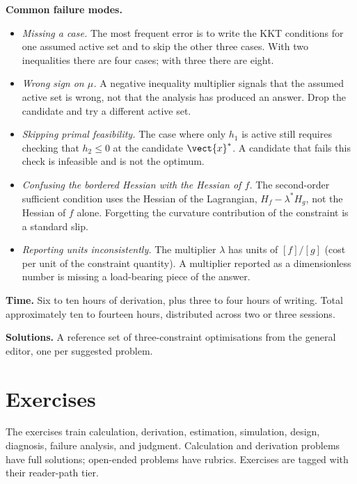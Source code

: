 \begin{project}
\textbf{Common failure modes.}
\begin{itemize}[leftmargin=*]
  \item \textit{Missing a case.} The most frequent error is to
    write the KKT conditions for one assumed active set and to
    skip the other three cases. With two inequalities there are
    four cases; with three there are eight.
  \item \textit{Wrong sign on $\mu$.} A negative inequality
    multiplier signals that the assumed active set is wrong, not
    that the analysis has produced an answer. Drop the candidate
    and try a different active set.
  \item \textit{Skipping primal feasibility.} The case where only
    $h_{1}$ is active still requires checking that $h_{2} \leq 0$
    at the candidate $\vect{x}^{*}$. A candidate that fails this
    check is infeasible and is not the optimum.
  \item \textit{Confusing the bordered Hessian with the Hessian of
    $f$.} The second-order sufficient condition uses the Hessian
    of the Lagrangian, $H_{f} - \lambda^{*} H_{g}$, not the Hessian
    of $f$ alone. Forgetting the curvature contribution of the
    constraint is a standard slip.
  \item \textit{Reporting units inconsistently.} The multiplier
    $\lambda$ has units of $[f] / [g]$ (cost per unit of the
    constraint quantity). A multiplier reported as a dimensionless
    number is missing a load-bearing piece of the answer.
\end{itemize}

\textbf{Time.} Six to ten hours of derivation, plus three to four
hours of writing. Total approximately ten to fourteen hours,
distributed across two or three sessions.

\textbf{Solutions.} A reference set of three-constraint
optimisations from the general editor, one per suggested problem.

\end{project}

\section{Exercises}

The exercises train calculation, derivation, estimation, simulation,
design, diagnosis, failure analysis, and judgment. Calculation and
derivation problems have full solutions; open-ended problems have
rubrics. Exercises are tagged with their reader-path tier.

